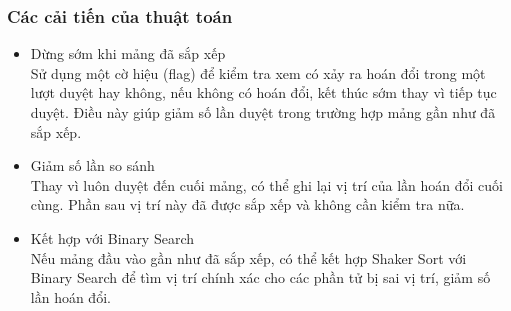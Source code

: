 \subsubsection{Các cải tiến của thuật toán}

\begin{itemize}
	
	\item Dừng sớm khi mảng đã sắp xếp \\
	Sử dụng một cờ hiệu (flag) để kiểm tra xem có xảy ra hoán đổi trong một lượt duyệt hay không, nếu không có hoán đổi, kết thúc sớm thay vì tiếp tục duyệt. Điều này giúp giảm số lần duyệt trong trường hợp mảng gần như đã sắp xếp.
	\item Giảm số lần so sánh \\
	Thay vì luôn duyệt đến cuối mảng, có thể ghi lại vị trí của lần hoán đổi cuối cùng. Phần sau vị trí này đã được sắp xếp và không cần kiểm tra nữa.
	\item Kết hợp với Binary Search \\
	Nếu mảng đầu vào gần như đã sắp xếp, có thể kết hợp Shaker Sort với Binary Search để tìm vị trí chính xác cho các phần tử bị sai vị trí, giảm số lần hoán đổi.
	
\end{itemize}